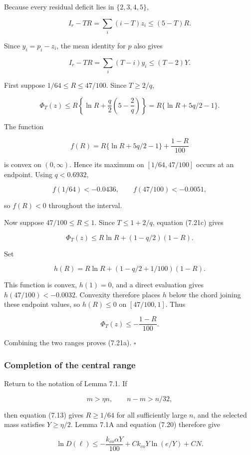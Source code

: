 \documentclass[11pt]{article}
\begin{document}
Because every residual deficit lies in \(\{2,3,4,5\}\),

\[
 I_r-TR=\sum_i(i-T)z_i\le(5-T)R.
 \tag{7.21b}
\]

Since \(y_i=p_i-z_i\), the mean identity for \(p\) also gives

\[
 I_r-TR=\sum_i(T-i)y_i\le(T-2)Y.
 \tag{7.21c}
\]

First suppose \(1/64\le R\le47/100\). Since \(T\ge2/q\),

\[
 \Phi_T(z)
 \le R\left\{\ln R+\frac q2\left(5-\frac2q\right)\right\}
 =R\{\ln R+5q/2-1\}.
 \tag{7.21d}
\]

The function

\[
 f(R)=R\{\ln R+5q/2-1\}+\frac{1-R}{100}
\]

is convex on \((0,\infty)\). Hence its maximum on \([1/64,47/100]\) occurs at an endpoint. Using \(q<0.6932\),

\[
 f(1/64)<-0.0436,
 \qquad
 f(47/100)<-0.0051,
\]

so \(f(R)<0\) throughout the interval.

Now suppose \(47/100\le R\le1\). Since \(T\le1+2/q\), equation (7.21c) gives

\[
 \Phi_T(z)
 \le R\ln R+(1-q/2)(1-R).
 \tag{7.21e}
\]

Set

\[
 h(R)=R\ln R+(1-q/2+1/100)(1-R).
\]

This function is convex, \(h(1)=0\), and a direct evaluation gives \(h(47/100)<-0.0032\). Convexity therefore places \(h\) below the chord joining these endpoint values, so \(h(R)\le0\) on \([47/100,1]\). Thus

\[
 \Phi_T(z)\le-\frac{1-R}{100}.
\]

Combining the two ranges proves (7.21a). \(\square\)

\subsubsection{Completion of the central range}\label{completion-of-the-central-range}

Return to the notation of Lemma 7.1. If

\[
 m>\eta n,
 \qquad
 n-m>n/32,
\]

then equation (7.13) gives \(R\ge1/64\) for all sufficiently large \(n\), and the selected mass satisfies \(Y\ge\eta/2\). Lemma 7.1A and equation (7.20) therefore give

\[
 \ln D(\ell)
 \le-\frac{k_{co}\alpha Y}{100}
      +Ck_{co}Y\ln(e/Y)+CN.
 \tag{7.24a}
\]
\end{document}

